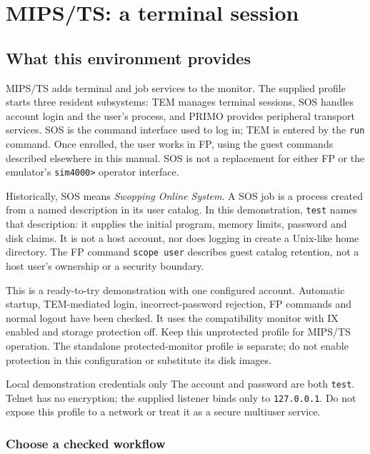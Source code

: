 \chapter{MIPS/TS: a terminal session}\label{mips-ts}

\section{What this environment provides}\label{mips-ts-overview}

MIPS/TS adds terminal and job services to the monitor. The supplied profile
starts three resident subsystems: TEM manages terminal sessions, SOS handles
account login and the user's process, and PRIMO provides peripheral transport
services. SOS is the command interface used to log in; TEM is entered by the
\texttt{run} command. Once enrolled, the user works in FP, using the guest
commands described elsewhere in this manual. SOS is not a replacement for
either FP or the emulator's \texttt{sim4000>} operator interface.

Historically, SOS means \emph{Swopping Online System}. A SOS job is a
process created from a named description in its user catalog. In this
demonstration, \texttt{test} names that description: it supplies the initial
program, memory limits, password and disk claims. It is not a host account,
nor does logging in create a Unix-like home directory. The FP command
\texttt{scope user} describes guest catalog retention, not a host user's
ownership or a security boundary.

This is a ready-to-try demonstration with one configured account. Automatic
startup, TEM-mediated login, incorrect-password rejection, FP commands and
normal logout have been checked. It uses the compatibility monitor with IX
enabled and storage protection off. Keep this unprotected profile for MIPS/TS
operation. The standalone protected-monitor profile is separate; do not enable
protection in this configuration or substitute its disk images.

\begin{operationnote}{Local demonstration credentials only}
The account and password are both \texttt{test}. Telnet has no encryption;
the supplied listener binds only to \texttt{127.0.0.1}. Do not expose this
profile to a network or treat it as a secure multiuser service.
\end{operationnote}

\subsection{Choose a checked workflow}\label{mips-ts-workflow-guide}

